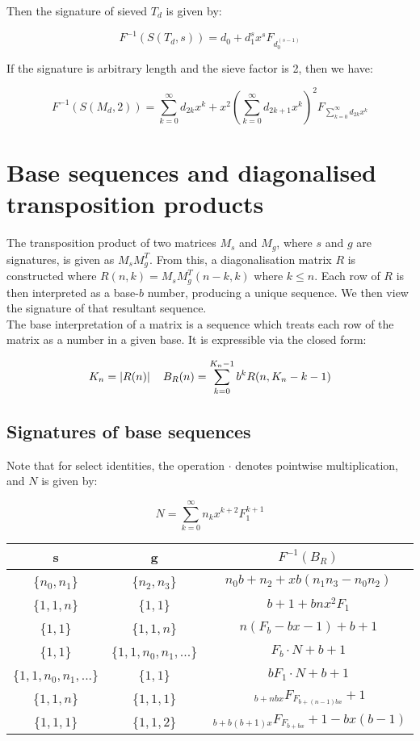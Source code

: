 \documentclass{article}
\begin{document}
\noindent Then the signature of sieved $T_d$ is given by:

$$F^{-1}(S(T_d, s)) = d_0 + d_1^s x^s F_{d_0^{(s-1)}}$$

\noindent If the signature is arbitrary length and the sieve factor is 2, then we have:

$$F^{-1}(S(M_d, 2)) = \sum_{k=0}^{\infty} d_{2k} x^k + x^2 \left( \sum_{k=0}^{\infty} d_{2k+1} x^k \right)^2 F_{\displaystyle \sum_{k=0}^{\infty} d_{2k} x^k}$$

\section{Base sequences and diagonalised transposition products}

The transposition product of two matrices $M_s$ and $M_g$, where $s$ and $g$ are signatures, is given as $M_s M_g^T$. From this, a diagonalisation matrix $R$ is constructed where $R(n,k) = M_s M_g^T (n-k, k)$ where $k \leq n$. Each row of $R$ is then interpreted as a base-$b$ number, producing a unique sequence. We then view the signature of that resultant sequence.\\

\noindent The base interpretation of a matrix is a sequence which treats each row of the matrix as a number in a given base. It is expressible via the closed form:

$$K_n = |R(n)| \hspace{4mm} B_{R}(n) = \sum_{k=0}^{K_n-1} b^k R (n, K_n - k - 1)$$

\subsection{Signatures of base sequences}

\noindent Note that for select identities, the operation $\cdot$ denotes pointwise multiplication, and $N$ is given by:

$$N = \sum_{k=0}^{\infty} n_k x^{k+2} F_1^{k+1}$$

\begin{center}
\begin{tabular}{|c|c|c|}
\hline
s & g & $F^{-1}(B_R)$\\
\hline
\{$n_0, n_1$\} & \{$n_2, n_3$\} & $n_0 b + n_2 + xb(n_1 n_3 - n_0 n_2)$\\
\hline
\{$1,1,n$\} & \{$1,1$\} & $b+1 + bnx^2 F_1$\\
\hline
\{$1,1$\} & \{$1,1,n$\} & $n(F_b - bx - 1) + b + 1$\\
\hline
\{$1, 1$\} & \{$1,1,n_0,n_1,...$\} & $F_b \cdot N + b + 1$\\
\hline
\{$1, 1, n_0, n_1, ...$\} & \{$1,1$\} & $bF_1 \cdot N + b + 1$\\
\hline
\{$1, 1, n$\} & \{$1,1,1$\} & $~_{b + nbx}F_{F_{b + (n-1)bx}}+1$\\
\hline
\{$1, 1, 1$\} & \{$1,1,2$\} & $~_{b + b(b+1)x}F_{F_{b + bx}}+ 1 - bx(b-1)$\\
\hline
\end{tabular}
\end{center}
\end{document}
